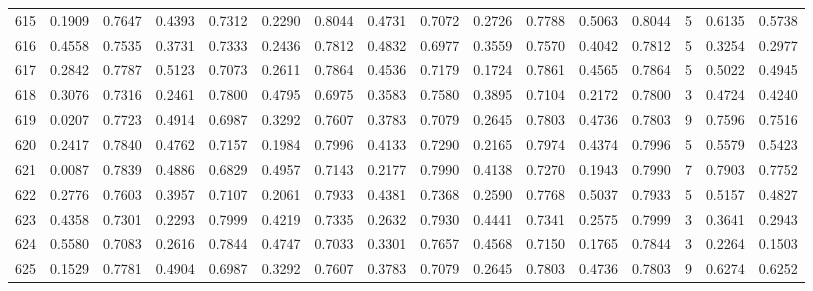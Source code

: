 \begin{tabular}{lrrrrrrrrrrrrrrr}
615 &      0.1909 &  0.7647 &  0.4393 &  0.7312 &  0.2290 &  0.8044 &  0.4731 &  0.7072 &  0.2726 &  0.7788 &   0.5063 &     0.8044 &      5 &                    0.6135 &                     0.5738 \\
616 &      0.4558 &  0.7535 &  0.3731 &  0.7333 &  0.2436 &  0.7812 &  0.4832 &  0.6977 &  0.3559 &  0.7570 &   0.4042 &     0.7812 &      5 &                    0.3254 &                     0.2977 \\
617 &      0.2842 &  0.7787 &  0.5123 &  0.7073 &  0.2611 &  0.7864 &  0.4536 &  0.7179 &  0.1724 &  0.7861 &   0.4565 &     0.7864 &      5 &                    0.5022 &                     0.4945 \\
618 &      0.3076 &  0.7316 &  0.2461 &  0.7800 &  0.4795 &  0.6975 &  0.3583 &  0.7580 &  0.3895 &  0.7104 &   0.2172 &     0.7800 &      3 &                    0.4724 &                     0.4240 \\
619 &      0.0207 &  0.7723 &  0.4914 &  0.6987 &  0.3292 &  0.7607 &  0.3783 &  0.7079 &  0.2645 &  0.7803 &   0.4736 &     0.7803 &      9 &                    0.7596 &                     0.7516 \\
620 &      0.2417 &  0.7840 &  0.4762 &  0.7157 &  0.1984 &  0.7996 &  0.4133 &  0.7290 &  0.2165 &  0.7974 &   0.4374 &     0.7996 &      5 &                    0.5579 &                     0.5423 \\
621 &      0.0087 &  0.7839 &  0.4886 &  0.6829 &  0.4957 &  0.7143 &  0.2177 &  0.7990 &  0.4138 &  0.7270 &   0.1943 &     0.7990 &      7 &                    0.7903 &                     0.7752 \\
622 &      0.2776 &  0.7603 &  0.3957 &  0.7107 &  0.2061 &  0.7933 &  0.4381 &  0.7368 &  0.2590 &  0.7768 &   0.5037 &     0.7933 &      5 &                    0.5157 &                     0.4827 \\
623 &      0.4358 &  0.7301 &  0.2293 &  0.7999 &  0.4219 &  0.7335 &  0.2632 &  0.7930 &  0.4441 &  0.7341 &   0.2575 &     0.7999 &      3 &                    0.3641 &                     0.2943 \\
624 &      0.5580 &  0.7083 &  0.2616 &  0.7844 &  0.4747 &  0.7033 &  0.3301 &  0.7657 &  0.4568 &  0.7150 &   0.1765 &     0.7844 &      3 &                    0.2264 &                     0.1503 \\
625 &      0.1529 &  0.7781 &  0.4904 &  0.6987 &  0.3292 &  0.7607 &  0.3783 &  0.7079 &  0.2645 &  0.7803 &   0.4736 &     0.7803 &      9 &                    0.6274 &                     0.6252 \\

\end{tabular}
